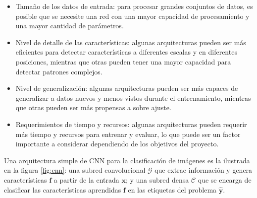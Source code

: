 \begin{itemize}
    \item Tamaño de los datos de entrada: para procesar grandes conjuntos de datos, es posible que se necesite una red con una
          mayor capacidad de procesamiento y una mayor cantidad de parámetros.
    \item Nivel de detalle de las características: algunas arquitecturas pueden ser más eficientes para detectar características
          a diferentes escalas y en diferentes posiciones, mientras que otras pueden tener una mayor capacidad para detectar
          patrones complejos.
    \item Nivel de generalización: algunas arquitecturas pueden ser más capaces de generalizar a datos nuevos y menos vistos
          durante el entrenamiento, mientras que otras pueden ser más propensas a sobre ajuste.
    \item Requerimientos de tiempo y recursos: algunas arquitecturas pueden requerir más tiempo y recursos para entrenar y
          evaluar, lo que puede ser un factor importante a considerar dependiendo de los objetivos del proyecto.
\end{itemize}

Una arquitectura simple de CNN para la clasificación de imágenes es la ilustrada en la figura \ref{fig:cnn}: una subred
convolucional $\mathcal{G}$ que extrae información y genera características $\mathbf{f}$ a partir de la entrada
$\mathbf{x}$; y una subred densa $\mathcal{C}$ que se encarga de clasificar las características aprendidas $\mathbf{f}$
en las etiquetas del problema $\mathbf{\hat{y}}$.


